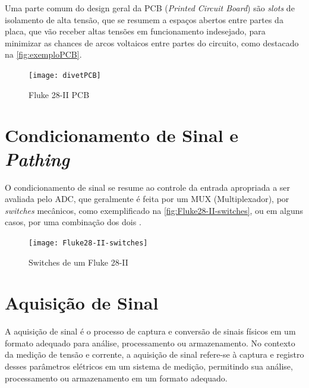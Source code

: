 Uma parte comum do design geral da \gls{PCB} (\textit{Printed Circuit Board}) são \textit{slots} de isolamento de alta tensão, que se resumem a espaços abertos entre partes da placa, que vão receber altas tensões em funcionamento indesejado, para minimizar as chances de arcos voltaicos entre partes do circuito, como destacado na \autoref{fig:exemploPCB}. %

\begin{figure}[htb!]%
    \caption{Fluke 28-II PCB}%
    \label{fig:exemploPCB}%
    \texttt{[image: divetPCB]}%
\end{figure}

\section{Condicionamento de Sinal e \textit{Pathing}}\label{sec:signalConditioningandPathing}

O condicionamento de sinal se resume ao controle da entrada apropriada a ser avaliada pelo ADC, que geralmente é feita por um \gls{MUX} (Multiplexador), por \textit{switches} mecânicos, como exemplificado na \autoref{fig:Fluke28-II-switches}, ou em alguns casos, por uma combinação dos dois \cite{dmmblog}.

\begin{figure}[htb!]%
    \caption{Switches de um Fluke 28-II}%
    \label{fig:Fluke28-II-switches}%
    \texttt{[image: Fluke28-II-switches]}%
\end{figure}

\section{Aquisição de Sinal}\label{sec:aqSignal}

A aquisição de sinal é o processo de captura e conversão de sinais físicos em um formato adequado para análise, processamento ou armazenamento. No contexto da medição de tensão e corrente, a aquisição de sinal refere-se à captura e registro desses parâmetros elétricos em um sistema de medição, permitindo sua análise, processamento ou armazenamento em um formato adequado.

